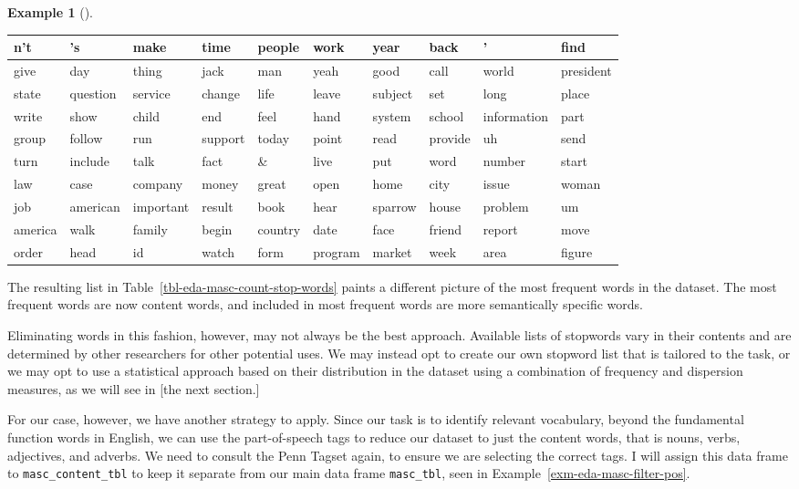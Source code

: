 \documentclass[
  letterpaper,
  DIV=11,
  numbers=noendperiod]{scrreport}
\theoremstyle{definition}
\newtheorem{example}{Example}[chapter]
\theoremstyle{remark}
\begin{document}
\begin{example}[]
\begin{table}
\centering
\begin{tabular}{l|l|l|l|l|l|l|l|l|l}
\hline
n't & 's & make & time & people & work & year & back & ' & find\\
\hline
give & day & thing & jack & man & yeah & good & call & world & president\\
\hline
state & question & service & change & life & leave & subject & set & long & place\\
\hline
write & show & child & end & feel & hand & system & school & information & part\\
\hline
group & follow & run & support & today & point & read & provide & uh & send\\
\hline
turn & include & talk & fact & \& & live & put & word & number & start\\
\hline
law & case & company & money & great & open & home & city & issue & woman\\
\hline
job & american & important & result & book & hear & sparrow & house & problem & um\\
\hline
america & walk & family & begin & country & date & face & friend & report & move\\
\hline
order & head & id & watch & form & program & market & week & area & figure\\
\hline
\end{tabular}
\end{table}

\end{example}

The resulting list in Table~\ref{tbl-eda-masc-count-stop-words} paints a
different picture of the most frequent words in the dataset. The most
frequent words are now content words, and included in most frequent
words are more semantically specific words.

Eliminating words in this fashion, however, may not always be the best
approach. Available lists of stopwords vary in their contents and are
determined by other researchers for other potential uses. We may instead
opt to create our own stopword list that is tailored to the task, or we
may opt to use a statistical approach based on their distribution in the
dataset using a combination of frequency and dispersion measures, as we
will see in {[}the next section.{]}

For our case, however, we have another strategy to apply. Since our task
is to identify relevant vocabulary, beyond the fundamental function
words in English, we can use the part-of-speech tags to reduce our
dataset to just the content words, that is nouns, verbs, adjectives, and
adverbs. We need to consult the Penn Tagset again, to ensure we are
selecting the correct tags. I will assign this data frame to
\texttt{masc\_content\_tbl} to keep it separate from our main data frame
\texttt{masc\_tbl}, seen in Example~\ref{exm-eda-masc-filter-pos}.
\end{document}
